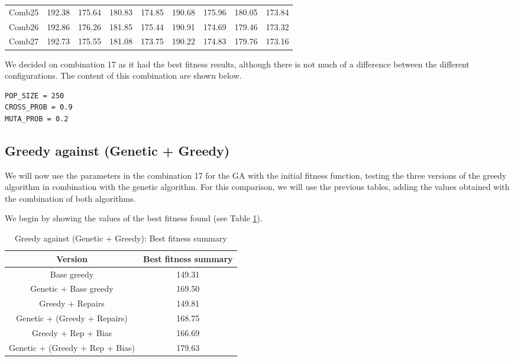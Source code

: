 \begin{table}[H]
{\begin{tabular}{|c|c|c|c|c|c|c|c|c|}
        Comb25	& 192.38	& 175.64	& 180.83	& 174.85	& 190.68	& 175.96	& 180.05	& 173.84 \\

        Comb26	& 192.86	& 176.26	& 181.85	& 175.44	& 190.91	& 174.69	& 179.46	& 173.32 \\

        Comb27	& 192.73	& 175.55	& 181.08	& 173.75	& 190.22	& 174.83	& 179.76	& 173.16 \\
        \hline
    \end{tabular}
    }
\end{table}


We decided on combination 17 as it had the best fitness results, although there is not much of a difference between the different configurations. The content of this combination are shown below.

\begin{lstlisting}[basicstyle=\small]
POP_SIZE = 250
CROSS_PROB = 0.9
MUTA_PROB = 0.2
\end{lstlisting}



\subsection{Greedy against (Genetic + Greedy)}

We will now use the parameters in the combination 17 for the GA with the initial fitness function, testing the three versions of the greedy algorithm in combination with the genetic algorithm. For this comparison, we will use the previous tables, adding the values obtained with the combination of both algorithms.

We begin by showing the values of the best fitness found (see Table \ref{table-greedgen-fn}).


\begin{table}[H]
    \centering
    \caption{Greedy against (Genetic + Greedy): Best fitness summary}
    \label{table-greedgen-fn}
    \begin{tabular}{|c|c|}
        \hline
        \textbf{Version} & \textbf{Best fitness summary} \\
        \hline
        \rowcolor{blue!30}
        Base greedy & 149.31 \\
        \rowcolor{blue!10}
        Genetic + Base greedy & 169.50 \\
        \rowcolor{blue!30}
        Greedy + Repairs & 149.81 \\
        \rowcolor{blue!10}
        Genetic + (Greedy + Repairs) & 168.75 \\
        \rowcolor{blue!30}
        Greedy + Rep + Bias & 166.69 \\
        \rowcolor{blue!10}
        Genetic + (Greedy + Rep + Bias) & 179.63 \\
        \hline
    \end{tabular}
\end{table}

